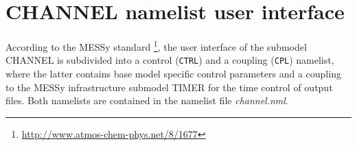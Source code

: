 \documentclass[twoside]{article}
\begin{document}
{\section{CHANNEL namelist user interface}
\label{sec:channelui}
According to the MESSy standard
\citep{442}\footnote{\url{http://www.atmos-chem-phys.net/8/1677}},
the user interface of the submodel CHANNEL
is subdivided into a control ({\tt CTRL}) and a coupling ({\tt CPL}) namelist,
where the latter contains base model specific control parameters and
a coupling to the MESSy infrastructure submodel TIMER for the time control
of output files.
Both namelists are contained in the namelist file {\it channel.nml}.

}
\end{document}
